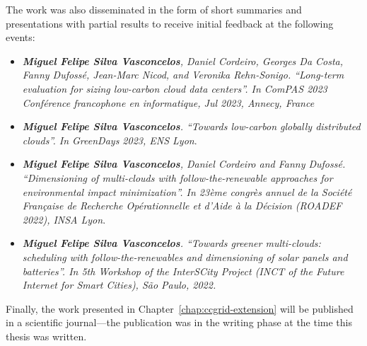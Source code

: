 The work was also disseminated in the form of short summaries and presentations with partial results to receive initial feedback at the following events:

\begin{itemize}

\item \textit{\textbf{Miguel Felipe Silva Vasconcelos}, Daniel Cordeiro, Georges Da Costa, Fanny Dufossé, Jean-Marc Nicod, and Veronika Rehn-Sonigo. ``Long-term evaluation for sizing low-carbon cloud data centers''. In ComPAS 2023 Conférence francophone en informatique, Jul 2023, Annecy, France}

\item  \textit{\textbf{Miguel Felipe Silva Vasconcelos}. ``Towards low-carbon globally distributed clouds''. In GreenDays 2023, ENS Lyon}.

\item  \textit{\textbf{Miguel Felipe Silva Vasconcelos}, Daniel Cordeiro and Fanny Dufossé. ``Dimensioning of multi-clouds with follow-the-renewable approaches for environmental impact minimization''. In 23ème congrès annuel de la Société Française de Recherche Opérationnelle et d’Aide à la Décision (ROADEF 2022), INSA Lyon}.

\item  \textit{\textbf{Miguel Felipe Silva Vasconcelos}. ``Towards greener multi-clouds: scheduling with follow-the-renewables and dimensioning of solar panels and batteries''. In 5th Workshop of the InterSCity Project (INCT of the Future Internet for Smart Cities), São Paulo, 2022.}

\end{itemize}

Finally, the work presented in Chapter~\ref{chap:ccgrid-extension} will be published in a scientific journal---the publication was in the writing phase at the time this thesis was written.